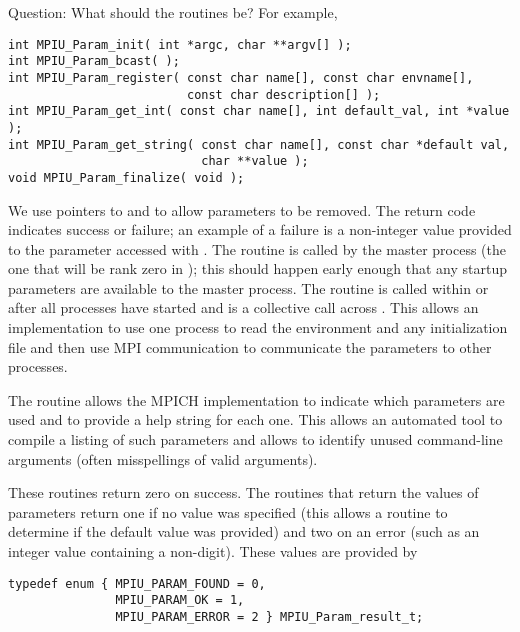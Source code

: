 \documentclass{article}
\begin{document}
Question: What should the routines be?  For 
example,%
%
\begin{verbatim}
int MPIU_Param_init( int *argc, char **argv[] );
int MPIU_Param_bcast( );
int MPIU_Param_register( const char name[], const char envname[], 
                         const char description[] );
int MPIU_Param_get_int( const char name[], int default_val, int *value );
int MPIU_Param_get_string( const char name[], const char *default val,
                           char **value );
void MPIU_Param_finalize( void );
\end{verbatim}
We use pointers to  and  to allow parameters to be
removed.  The return code indicates success or failure; an example of a
failure is a non-integer value provided to the parameter accessed with
. 
The routine  is called by the master process (the one
that will be rank zero in ); this should happen early
enough that any startup parameters are available to the master process.  The
routine  is called within  or
 after all processes have started and is a collective
call across .  This allows an implementation to use one
process to read the environment and any initialization file and then use MPI
communication to communicate the parameters to other processes.  

The routine  allows the MPICH implementation to
indicate which parameters are used and to provide a help string for each one.
This allows an automated tool to compile a listing of such parameters and
allows  to identify unused command-line arguments
(often misspellings of valid arguments).

These routines return zero on success.  The routines that return the values of
parameters return one if no value was specified (this allows a routine to
determine if the default value was provided) and two on an error (such as an
integer value containing a non-digit).  These values are provided by
\begin{verbatim}
typedef enum { MPIU_PARAM_FOUND = 0, 
               MPIU_PARAM_OK = 1, 
               MPIU_PARAM_ERROR = 2 } MPIU_Param_result_t;
\end{verbatim}
\end{document}
